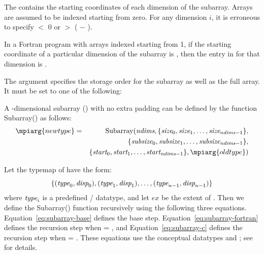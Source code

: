 The  contains the
starting coordinates of each
dimension of the subarray.
Arrays are assumed to be indexed starting from zero.
For any dimension $i$, it is erroneous to specify
 $<$ 0 or
$>$ ( $-$ ).

\begin{users}
In a Fortran program with arrays indexed starting from 1,
if the starting coordinate of a particular dimension
of the subarray is ,
then the entry in 
for that dimension is .
\end{users}

The  argument specifies the storage order for the
subarray as well as the full array.
It must be set to one
of the following:
\begin{constlist}
\end{constlist}

A -dimensional subarray () with no
extra padding can be defined by the function Subarray() as
follows:
\begin{eqnarray*}
\mpiarg{newtype} & = &  \mbox{Subarray}( \mword{ndims},
                        \{\mword{size}_0, \mword{size}_1,\ldots,\mword{size}_{\msword{ndims}-1}\},        \\
                 &   &  \{\mword{subsize}_0, \mword{subsize}_1,\ldots,\mword{subsize}_{\msword{ndims}-1}\}, \\
                 &   &  \{\mword{start}_0, \mword{start}_1,\ldots,\mword{start}_{\msword{ndims}-1}\},
                        {\mpiarg{oldtype}} )
\end{eqnarray*}

Let the typemap of  have the form:
\begin{displaymath}
\{(\textrm{\itshape{type}}_0,\textrm{\itshape{disp}}_0),(\textrm{\itshape{type}}_1,\textrm{\itshape{disp}}_1),\ldots,(\textrm{\itshape{type}}_{n-1},\textrm{\itshape{disp}}_{n-1})\}
\end{displaymath}
where $\textrm{\itshape{type}}_i$ is a predefined \MPI/ datatype, and let $ex$ be the
extent of .  Then we define the Subarray() function
recursively using the following three equations.
Equation~\ref{eq:subarray-base} defines the base step.
Equation~\ref{eq:subarray-fortran} defines the recursion step when
 = , and
Equation~\ref{eq:subarray-c} defines the recursion step when
 = .
These equations use the conceptual datatypes 
and ; see  for details.


